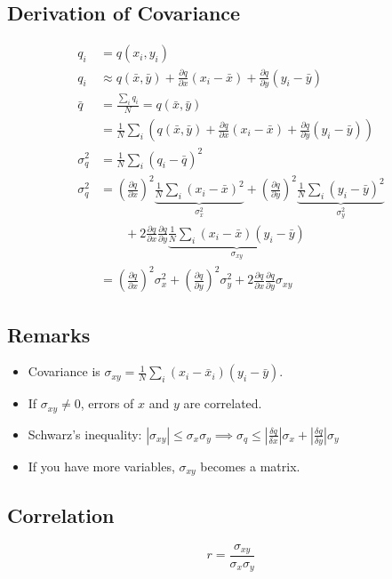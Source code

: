 \documentclass[twocolumn]{article}
\begin{document}
\subsection{Derivation of Covariance}
\begin{align*}
    q_i &= q(x_i, y_i) \\
    q_i &\approx q(\bar{x}, \bar{y}) + \frac{\partial q}{\partial x} (x_i - \bar{x}) + \frac{\partial q}{\partial y} (y_i - \bar{y}) \\
    \bar{q} &= \frac{\sum_i q_i}{N} = q(\bar{x}, \bar{y})\\
    &= \frac{1}{N} \sum_i \left( q(\bar{x}, \bar{y}) + \frac{\partial q}{\partial x} (x_i - \bar{x}) + \frac{\partial q}{\partial y} (y_i - \bar{y}) \right) \\
    \sigma^2_q &= \frac{1}{N} \sum_i (q_i - \bar{q})^2 \\
    \sigma_q^2 &= \left( \frac{\partial q}{\partial x} \right)^2 \underbrace{\frac{1}{N} \sum_i (x_i - \bar{x})^2}_{\sigma_x^2} + \left( \frac{\partial q}{\partial y} \right)^2 \underbrace{\frac{1}{N} \sum_i (y_i - \bar{y})^2}_{\sigma_y^2} \\
    &\quad\quad + 2 \frac{\partial q}{\partial x} \frac{\partial q}{\partial y} \underbrace{\frac{1}{N} \sum_i (x_i - \bar{x}) (y_i - \bar{y})}_{\sigma_{xy}} \\
    & = \left( \frac{\partial q}{\partial x} \right)^2 \sigma_x^2 + \left( \frac{\partial q}{\partial y} \right)^2 \sigma_y^2 + 2 \frac{\partial q}{\partial x} \frac{\partial q}{\partial y} \sigma_{xy}
\end{align*}

\subsection{Remarks}
\begin{itemize}
    \item Covariance is $\sigma_{xy} = \frac{1}{N} \sum_i (x_i - \bar{x}_i) (y_i - \bar{y})$.
    \item If $\sigma_{xy} \neq 0$, errors of $x$ and $y$ are correlated.
    \item Schwarz's inequality: $|\sigma_{xy}| \leq \sigma_x \sigma_y \implies \sigma_q \leq \left| \frac{\delta q}{\delta x} \right| \sigma_x + \left| \frac{\delta q}{\delta y} \right| \sigma_y$
    \item If you have more variables, $\sigma_{xy}$ becomes a matrix.
\end{itemize}

\subsection{Correlation}

\begin{equation}
    r = \frac{\sigma_{xy}}{\sigma_x \sigma_y}
\end{equation}
\end{document}
